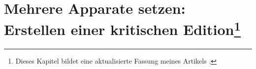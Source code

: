 
\chapter[Mehrere Apparate setzen: Erstellen einer kritischen Edition]{Mehrere Apparate setzen:\\Erstellen einer kritischen Edition\footnote{Dieses Kapitel bildet eine aktualisierte Fassung meines Artikels \cite{pilhofer:dtk2017}.}}




\label{reledmac}


\newcommand\vari[3][]{%
\edtext{#2}{%
  \if$#1$\lemma{\gkk{#2}}\else\lemma{\gkk{#1}}\fi
  \Cfootnote{#3}}}

\newcommand\quell[3][]{%
\edtext{#2}{%
  \if$#1$\lemma{\gkk{#2}}\else\lemma{\gkk{#1}}\fi
  \Bfootnote{#3}}}

\newsavebox\bspbox
\newenvironment{reledmacbsp}[1]{%
  \begin{lrbox}{\bspbox}
  \begin{minipage}[t]{0.95\linewidth}
  \beginnumbering
  #1%
  \pstart[\subsubsection*{Strabons Geographika XIV 5,1}]%
}%
{%
  \pend
  \endnumbering
  \end{minipage}%
  \end{lrbox}%
  \colorbox{black!5}{%
  \begin{minipage}{\textwidth}%
  \usebox\bspbox
  \end{minipage}}
  \medskip
}

\newcommand\bsplineenum{\firstlinenum{2}\linenumincrement{2}}

\setcounter{alteSeite}{269}
\newcommand\alteSeite{{|\ledsidenote{\emph{T}~\thealteSeite}}}%

